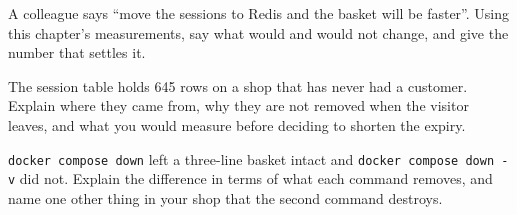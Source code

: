 \begin{checkpoint}
\begin{tightnum}
  \item A colleague says ``move the sessions to Redis and the basket will be
        faster''. Using this chapter's measurements, say what would and would
        not change, and give the number that settles it.
  \item The session table holds 645 rows on a shop that has never had a
        customer. Explain where they came from, why they are not removed when
        the visitor leaves, and what you would measure before deciding to
        shorten the expiry.
  \item \texttt{docker compose down} left a three-line basket intact and
        \texttt{docker compose down -v} did not. Explain the difference in
        terms of what each command removes, and name one other thing in your
        shop that the second command destroys.
\end{tightnum}
\end{checkpoint}

